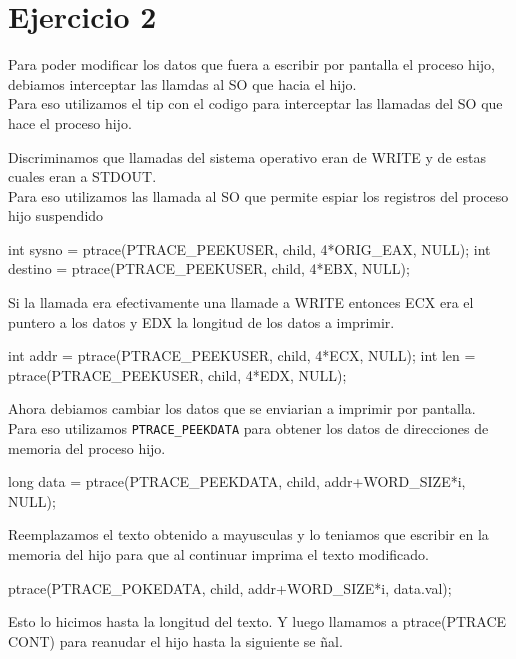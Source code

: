 \newpage

\section{Ejercicio 2}

Para poder modificar los datos que fuera a escribir por pantalla el proceso hijo, debiamos interceptar las llamdas al SO que hacia el hijo.\\
Para eso utilizamos el tip con el codigo para interceptar las llamadas del SO que hace el proceso hijo.


Discriminamos que llamadas del sistema operativo eran de WRITE y de estas cuales eran a STDOUT.\\
Para eso utilizamos las llamada al SO que permite espiar los registros del proceso hijo suspendido

\begin{framed}
\begin{verbatimtab}
int sysno = ptrace(PTRACE_PEEKUSER, child, 4*ORIG_EAX, NULL);
int destino = ptrace(PTRACE_PEEKUSER, child, 4*EBX, NULL);
\end{verbatimtab}
\end{framed}

Si la llamada era efectivamente una llamade a WRITE entonces ECX era el puntero a los datos y EDX la longitud de los datos a imprimir.

\begin{framed}
\begin{verbatimtab}
int addr = ptrace(PTRACE_PEEKUSER, child, 4*ECX, NULL);
int len = ptrace(PTRACE_PEEKUSER, child, 4*EDX, NULL);	
\end{verbatimtab}
\end{framed}

Ahora debiamos cambiar los datos que se enviarian a imprimir por pantalla.\\
Para eso utilizamos \verb|PTRACE_PEEKDATA| para obtener los datos de direcciones de memoria del proceso hijo.

\begin{framed}
\begin{verbatimtab}
long data = ptrace(PTRACE_PEEKDATA, child, addr+WORD_SIZE*i, NULL);
\end{verbatimtab}
\end{framed}

Reemplazamos el texto obtenido a mayusculas y lo teniamos que escribir en la memoria del hijo para que al continuar imprima el texto modificado.

\begin{framed}
\begin{verbatimtab}
ptrace(PTRACE_POKEDATA, child, addr+WORD_SIZE*i, data.val);
\end{verbatimtab}
\end{framed}

Esto lo hicimos hasta la longitud del texto. Y luego llamamos a ptrace(PTRACE CONT) para reanudar el hijo hasta la siguiente se \~nal.
